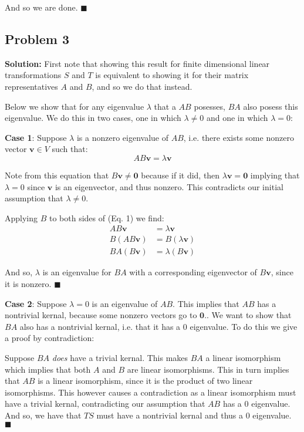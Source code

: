 \documentclass{article}
\renewcommand\vec{\mathbf}
\begin{document}
And so we are done. $\blacksquare$
\newpage

\subsection*{Problem 3}
\noindent\textbf{Solution:} First note that showing this result for finite dimensional linear transformations $S$ and $T$ is equivalent to showing it for their matrix representatives $A$ and $B$, and so we do that instead.

Below we show that for any eigenvalue $\lambda$ that a $AB$ posesses, $BA$ also posess this eigenvalue. We do this in two cases, one in which $\lambda\not=0$ and one in which $\lambda=0$:
\bigskip

\textbf{Case 1}: Suppose $\lambda$ is a nonzero eigenvalue of $AB$, i.e. there exists some nonzero vector $\vec v\in V$ such that:
\begin{equation}
  AB\vec v=\lambda\vec v\tag{Eq. 1}
\end{equation}

Note from this equation that $B\vec v\not=\vec 0$ because if it did, then $\lambda\vec v=\vec 0$ implying that $\lambda=0$ since $\vec v$ is an eigenvector, and thus nonzero. This contradicts our initial assumption that $\lambda\not=0$.

Applying $B$ to both sides of (Eq. 1) we find:
\begin{align*}
  AB\vec v&=\lambda\vec v\tag{Eq. 1}\\
  B(AB\vec v)&=B(\lambda\vec v)\\
  BA(B\vec v)&=\lambda (B\vec v)\tag{associativity}
\end{align*}

And so, $\lambda$ is an eigenvalue for $BA$ with a corresponding eigenvector of $B\vec v$, since it is nonzero. $\blacksquare$
\medskip

\textbf{Case 2}: Suppose $\lambda=0$ is an eigenvalue of $AB$. This implies that $AB$ has a nontrivial kernal, because some nonzero vectors go to $\vec 0$.. We want to show that $BA$ also has a nontrivial kernal, i.e. that it has a 0 eigenvalue. To do this we give a proof by contradiction:

Suppose $BA$ \textit{does} have a trivial kernal. This makes $BA$ a linear isomorphism which implies that both $A$ and $B$ are linear isomorphisms. This in turn implies that $AB$ is a linear isomorphism, since it is the product of two linear isomorphisms. This however causes a contradiction as a linear isomorphism must have a trivial kernal, contradicting our assumption that $AB$ has a 0 eigenvalue. And so, we have that $TS$ must have a nontrivial kernal and thus a 0 eigenvalue. $\blacksquare$
\bigskip
\end{document}
